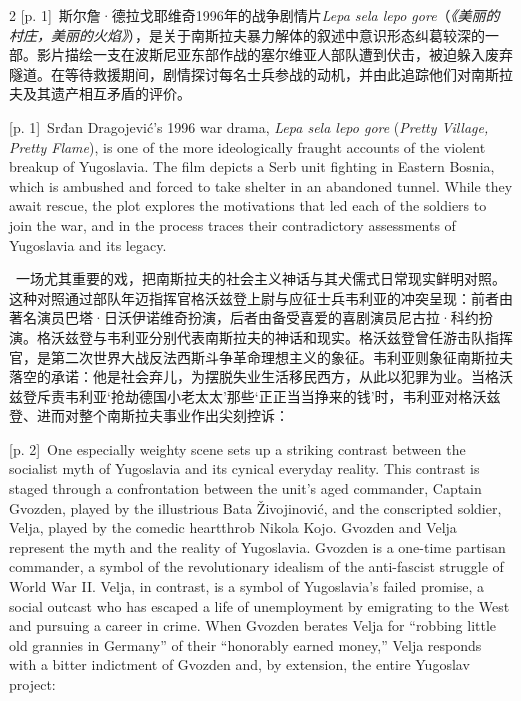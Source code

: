\documentclass[10pt,a4paper]{article}
\begin{document}
\begin{paracol}{2}
{\scriptsize\color{gray} [p. 1]}\ 斯尔詹·德拉戈耶维奇1996年的战争剧情片\textit{Lepa sela lepo gore}（\textit{《美丽的村庄，美丽的火焰》}），是关于南斯拉夫暴力解体的叙述中意识形态纠葛较深的一部。影片描绘一支在波斯尼亚东部作战的塞尔维亚人部队遭到伏击，被迫躲入废弃隧道。在等待救援期间，剧情探讨每名士兵参战的动机，并由此追踪他们对南斯拉夫及其遗产相互矛盾的评价。\par
\switchcolumn
{\scriptsize\color{gray} [p. 1]}\ Srđan Dragojević’s 1996 war drama, \textit{Lepa sela lepo gore} (\textit{Pretty Village, Pretty Flame}), is one of the more ideologically fraught accounts of the violent breakup of Yugoslavia. The film depicts a Serb unit fighting in Eastern Bosnia, which is ambushed and forced to take shelter in an abandoned tunnel. While they await rescue, the plot explores the motivations that led each of the soldiers to join the war, and in the process traces their contradictory assessments of Yugoslavia and its legacy.\par
\switchcolumn*
{\scriptsize\color{gray} [p. 2]}\ 一场尤其重要的戏，把南斯拉夫的社会主义神话与其犬儒式日常现实鲜明对照。这种对照通过部队年迈指挥官格沃兹登上尉与应征士兵韦利亚的冲突呈现：前者由著名演员巴塔·日沃伊诺维奇扮演，后者由备受喜爱的喜剧演员尼古拉·科约扮演。格沃兹登与韦利亚分别代表南斯拉夫的神话和现实。格沃兹登曾任游击队指挥官，是第二次世界大战反法西斯斗争革命理想主义的象征。韦利亚则象征南斯拉夫落空的承诺：他是社会弃儿，为摆脱失业生活移民西方，从此以犯罪为业。当格沃兹登斥责韦利亚‘抢劫德国小老太太’那些‘正正当当挣来的钱’时，韦利亚对格沃兹登、进而对整个南斯拉夫事业作出尖刻控诉：\par
\switchcolumn
{\scriptsize\color{gray} [p. 2]}\ One especially weighty scene sets up a striking contrast between the socialist myth of Yugoslavia and its cynical everyday reality. This contrast is staged through a confrontation between the unit’s aged commander, Captain Gvozden, played by the illustrious Bata Živojinović, and the conscripted soldier, Velja, played by the comedic heartthrob Nikola Kojo. Gvozden and Velja represent the myth and the reality of Yugoslavia. Gvozden is a one-time partisan commander, a symbol of the revolutionary idealism of the anti-fascist struggle of World War II. Velja, in contrast, is a symbol of Yugoslavia’s failed promise, a social outcast who has escaped a life of unemployment by emigrating to the West and pursuing a career in crime. When Gvozden berates Velja for “robbing little old grannies in Germany” of their “honorably earned money,” Velja responds with a bitter indictment of Gvozden and, by extension, the entire Yugoslav project:\par

\end{paracol}
\end{document}

